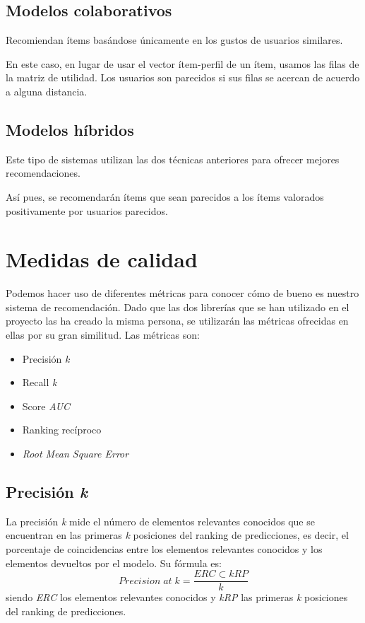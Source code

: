 \subsection{Modelos colaborativos}\label{collaborative-filtering}
Recomiendan ítems basándose únicamente en los gustos de usuarios similares.

En este caso, en lugar de usar el vector ítem-perfil de un ítem, usamos las filas de la matriz de utilidad. Los usuarios son parecidos si sus filas se acercan de acuerdo a alguna distancia.

\subsection{Modelos híbridos}\label{modelos-hibridos}
Este tipo de sistemas utilizan las dos técnicas anteriores para ofrecer mejores recomendaciones.

Así pues, se recomendarán ítems que sean parecidos a los ítems valorados positivamente por usuarios parecidos.

\section{Medidas de calidad}\label{medidas-de-calidad}
Podemos hacer uso de diferentes métricas para conocer cómo de bueno es nuestro sistema de recomendación. Dado que las dos librerías que se han utilizado en el proyecto las ha creado la misma persona, se utilizarán las métricas ofrecidas en ellas por su gran similitud. Las métricas son:
\begin{itemize}
\tightlist
\item Precisión \textit{k}
\item Recall \textit{k}
\item Score \textit{AUC}
\item Ranking recíproco
\item \textit{Root Mean Square Error}
\end{itemize}

\subsection{Precisión \textit{k}}\label{precision-k}
La precisión \textit{k} \cite{precision_at_k} mide el número de elementos relevantes conocidos que se encuentran en las primeras \textit{k} posiciones del ranking de predicciones, es decir, el porcentaje de coincidencias entre los elementos relevantes conocidos y los elementos devueltos por el modelo. Su fórmula es:
\begin{equation}
Precision\;at\;k = \frac{ERC \subset kRP}{k}
\end{equation}
siendo \textit{ERC} los elementos relevantes conocidos y \textit{kRP} las primeras \textit{k} posiciones del ranking de predicciones.

